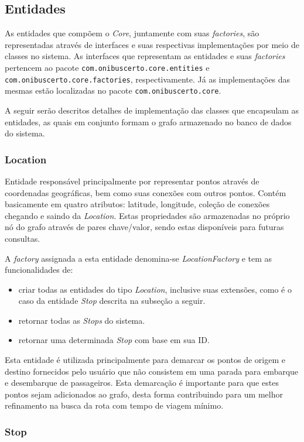 \subsection{Entidades}
As entidades que compõem o \emph{Core}, juntamente com suas \emph{factories}, são representadas através de interfaces e suas respectivas implementações por meio de classes no sistema.
As interfaces que representam as entidades e suas \emph{factories} pertencem ao pacote \texttt{com.onibuscerto.core.entities} e \texttt{com.onibuscerto.core.factories}, respectivamente.
Já as implementações das mesmas estão localizadas no pacote \texttt{com.onibuscerto.core}.

A seguir serão descritos detalhes de implementação das classes que encapsulam as entidades, as quais em conjunto formam o grafo armazenado no banco de dados do sistema.

\subsubsection{Location}
Entidade responsável principalmente por representar pontos através de coordenadas geográficas, bem como suas conexões com outros pontos.
Contém basicamente em quatro atributos: latitude, longitude, coleção de conexões chegando e saindo da \emph{Location}.
Estas propriedades são armazenadas no próprio nó do grafo através de pares chave/valor, sendo estas disponíveis para futuras consultas.

A \emph{factory} assignada a esta entidade denomina-se \emph{LocationFactory} e tem as funcionalidades de:
\begin{itemize}
	\item criar todas as entidades do tipo \emph{Location}, inclusive  suas extensões, como é o caso da entidade \emph{Stop} descrita na subseção a seguir.
	\item retornar todas as \emph{Stops} do sistema.
	\item retornar uma determinada \emph{Stop} com base em sua ID.
\end{itemize}

Esta entidade é utilizada principalmente para demarcar os pontos de origem e destino fornecidos pelo usuário que não consistem em uma parada para embarque e desembarque de passageiros.
Esta demarcação é importante para que estes pontos sejam adicionados ao grafo, desta forma contribuindo para um melhor refinamento na busca da rota com tempo de viagem mínimo.

\subsubsection{Stop}

